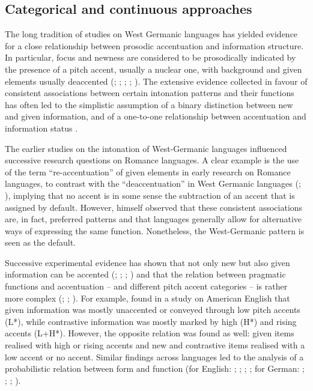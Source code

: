\subsection{Categorical and continuous approaches}
\label{sec:2.1.3}
The long tradition of studies on West Germanic languages has yielded evidence for a close relationship between prosodic accentuation and information structure. In particular, focus and newness are considered to be prosodically indicated by the presence of a pitch accent, usually a nuclear one, with background and given elements usually deaccented (\citealt{Cruttenden2006}; \citealt{FérySamek-Lodovici2006}; \citealt{Halliday1967}; \citealt{Ladd1996}; \citealt{Terken1984}). The extensive evidence collected in favour of consistent associations between certain intonation patterns and their functions has often led to the simplistic assumption of a binary distinction between new and given information, and of a one-to-one relationship between accentuation and information status \citep{Halliday1967}.

The earlier studies on the intonation of West-Germanic languages influenced successive research questions on Romance languages. A clear example is the use of the term “re-accentuation” of given elements in early research on Romance languages, to contrast with the “deaccentuation” in West Germanic languages (\citealt{Cruttenden1993}; \citealt{SwertsEtAl1999}), implying that no accent is in some sense the subtraction of an accent that is assigned by default. However, \citet{Cruttenden1993,Cruttenden1997} himself observed that these consistent associations are, in fact, preferred patterns and that languages generally allow for alternative ways of expressing the same function. Nonetheless, the West-Germanic pattern is seen as the default.

Successive experimental evidence has shown that not only new but also given information can be accented (\citealt{BardAylett1999}; \citealt{RiesterPiontek2015}; \citealt{SchweitzerEtAl2009}; \citealt{TerkenHirschberg1994}) and that the relation between pragmatic functions and accentuation – and different pitch accent categories – is rather more complex (\citealt{GriceEtAl2017}; \citealt{KrahmerSwerts2001}; \citealt{MückeGrice2014}). For example, \citet{ChodroffCole2019} found in a study on American English that given information was mostly unaccented or conveyed through low pitch accents (L*), while contrastive information was mostly marked by high (H*) and rising accents (L+H*). However, the opposite relation was found as well: given items realised with high or rising accents and new and contrastive items realised with a low accent or no accent. Similar findings across languages led to the analysis of a probabilistic relation between form and function (for English: \citealt{Calhoun2010}; \citealt{ChodroffEtAl2019}; \citealt{ItoEtAl2004}; \citealt{Yoon2010}; for German: \citealt{BaumannRiester2013}; \citealt{DeRuiter2015}; \citealt{KurumadaRoettger2022}; \citealt{RöhrBaumann2010}).


